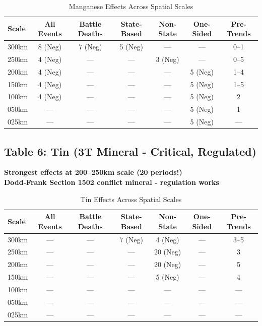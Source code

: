 \documentclass[11pt]{article}
\begin{document}
\begin{table}[H]
\centering
\caption{Manganese Effects Across Spatial Scales}
\begin{tabular}{lcccccc}
\toprule
Scale & All Events & Battle Deaths & State-Based & Non-State & One-Sided & Pre-Trends \\
\midrule
300km & 8 (Neg)   & 7 (Neg)       & 5 (Neg)     & ---       & ---       & 0--1       \\
250km & 4 (Neg)   & ---           & ---         & 3 (Neg)   & ---       & 0--5       \\
200km & 4 (Neg)   & ---           & ---         & ---       & 5 (Neg)   & 1--4       \\
150km & 4 (Neg)   & ---           & ---         & ---       & 5 (Neg)   & 1--5       \\
100km & 4 (Neg)   & ---           & ---         & ---       & 5 (Neg)   & 2          \\
050km & ---       & ---           & ---         & ---       & 5 (Neg)   & 1          \\
025km & ---       & ---           & ---         & ---       & 5 (Neg)   & ---        \\
\bottomrule
\end{tabular}
\end{table}

\subsection{Table 6: Tin (3T Mineral - Critical, Regulated)}

\textbf{Strongest effects at 200--250km scale (20 periods!)}\\
\textbf{Dodd-Frank Section 1502 conflict mineral - regulation works}

\begin{table}[H]
\centering
\caption{Tin Effects Across Spatial Scales}
\begin{tabular}{lcccccc}
\toprule
Scale & All Events & Battle Deaths & State-Based & Non-State & One-Sided & Pre-Trends \\
\midrule
300km & ---       & ---           & 7 (Neg)     & 4 (Neg)   & ---       & 3--5       \\
250km & ---       & ---           & ---         & 20 (Neg)  & ---       & 3          \\
200km & ---       & ---           & ---         & 20 (Neg)  & ---       & 5          \\
150km & ---       & ---           & ---         & 5 (Neg)   & ---       & 4          \\
100km & ---       & ---           & ---         & ---       & ---       & ---        \\
050km & ---       & ---           & ---         & ---       & ---       & ---        \\
025km & ---       & ---           & ---         & ---       & ---       & ---        \\
\bottomrule
\end{tabular}
\end{table}
\end{document}
